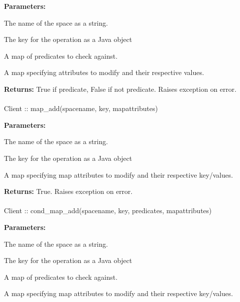 \noindent\textbf{Parameters:}
\begin{description}[labelindent=\widthof{{\code{predicates}}},leftmargin=*,noitemsep,nolistsep,align=right]
\item[\code{spacename}] The name of the space as a string.
\item[\code{key}] The key for the operation as a Java object
\item[\code{predicates}] A map of predicates to check against.
\item[\code{attributes}] A map specifying attributes to modify and their respective values.
\end{description}

\noindent\textbf{Returns:}
True if predicate, False if not predicate.  Raises exception on error.

\paragraph{}
\label{api:java:map_add}
\begin{javacode}
Client :: map_add(spacename, key, mapattributes)
\end{javacode}


\noindent\textbf{Parameters:}
\begin{description}[labelindent=\widthof{{\code{mapattributes}}},leftmargin=*,noitemsep,nolistsep,align=right]
\item[\code{spacename}] The name of the space as a string.
\item[\code{key}] The key for the operation as a Java object
\item[\code{mapattributes}] A map specifying map attributes to modify and their respective key/values.
\end{description}

\noindent\textbf{Returns:}
True.  Raises exception on error.

\paragraph{}
\label{api:java:cond_map_add}
\begin{javacode}
Client :: cond_map_add(spacename, key, predicates, mapattributes)
\end{javacode}


\noindent\textbf{Parameters:}
\begin{description}[labelindent=\widthof{{\code{mapattributes}}},leftmargin=*,noitemsep,nolistsep,align=right]
\item[\code{spacename}] The name of the space as a string.
\item[\code{key}] The key for the operation as a Java object
\item[\code{predicates}] A map of predicates to check against.
\item[\code{mapattributes}] A map specifying map attributes to modify and their respective key/values.
\end{description}

